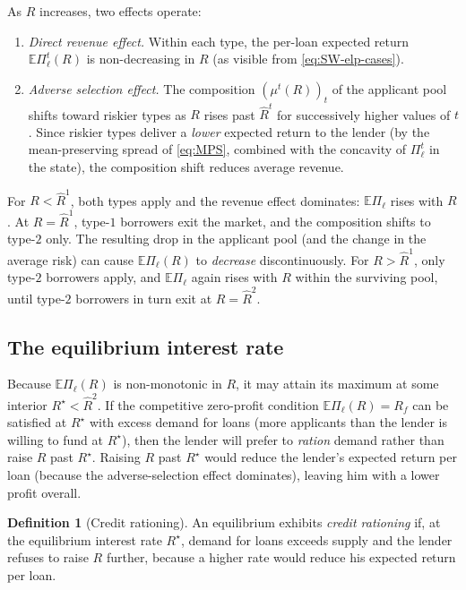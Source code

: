 \documentclass[11pt,a4paper,oneside]{book}
\def\E{\mathbb{E}}
\theoremstyle{plain}
\theoremstyle{definition}
\newtheorem{definition}[theorem]{Definition}
\theoremstyle{remark}
\numberwithin{equation}{chapter}
\begin{document}
As $R$ increases, two effects operate:
\begin{enumerate}
  \item \emph{Direct revenue effect.}
  Within each type, the per-loan expected return $\E \Pi_\ell^t(R)$ is non-decreasing in $R$ (as visible from \eqref{eq:SW-elp-cases}).
  \item \emph{Adverse selection effect.}
  The composition $(\mu^t(R))_t$ of the applicant pool shifts toward riskier types as $R$ rises past $\widehat{R}^t$ for successively higher values of $t$.
  Since riskier types deliver a \emph{lower} expected return to the lender (by the mean-preserving spread of \eqref{eq:MPS}, combined with the concavity of $\Pi_\ell^t$ in the state), the composition shift reduces average revenue.
\end{enumerate}

For $R < \widehat{R}^1$, both types apply and the revenue effect dominates: $\E \Pi_\ell$ rises with $R$.
At $R = \widehat{R}^1$, type-$1$ borrowers exit the market, and the composition shifts to type-$2$ only.
The resulting drop in the applicant pool (and the change in the average risk) can cause $\E \Pi_\ell(R)$ to \emph{decrease} discontinuously.
For $R > \widehat{R}^1$, only type-$2$ borrowers apply, and $\E \Pi_\ell$ again rises with $R$ within the surviving pool, until type-$2$ borrowers in turn exit at $R = \widehat{R}^2$.

\subsection{The equilibrium interest rate}

Because $\E \Pi_\ell(R)$ is non-monotonic in $R$, it may attain its maximum at some interior $R^\star < \widehat{R}^2$.
If the competitive zero-profit condition $\E \Pi_\ell(R) = R_f$ can be satisfied at $R^\star$ with excess demand for loans (more applicants than the lender is willing to fund at $R^\star$), then the lender will prefer to \emph{ration} demand rather than raise $R$ past $R^\star$.
Raising $R$ past $R^\star$ would reduce the lender's expected return per loan (because the adverse-selection effect dominates), leaving him with a lower profit overall.

\begin{definition}[Credit rationing]\label{def:SW-rationing}
An equilibrium exhibits \emph{credit rationing} if, at the equilibrium interest rate $R^\star$, demand for loans exceeds supply and the lender refuses to raise $R$ further, because a higher rate would reduce his expected return per loan.
\end{definition}
\end{document}

